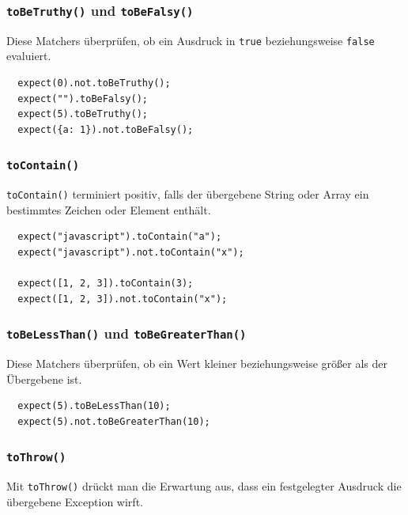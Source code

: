 \documentclass[11pt, a4paper]{article}
\begin{document}
\subsubsection*{\texttt{toBeTruthy()} und \texttt{toBeFalsy()}}

Diese Matchers überprüfen, ob ein Ausdruck in \texttt{true} beziehungsweise
\texttt{false} evaluiert.

\begin{verbatim}
  expect(0).not.toBeTruthy();
  expect("").toBeFalsy();
  expect(5).toBeTruthy();
  expect({a: 1}).not.toBeFalsy();
\end{verbatim}

\clearpage

\subsubsection*{\texttt{toContain()}}

\texttt{toContain()} terminiert positiv, falls der übergebene String oder Array
ein bestimmtes Zeichen oder Element enthält.

\begin{verbatim}
  expect("javascript").toContain("a");
  expect("javascript").not.toContain("x");

  expect([1, 2, 3]).toContain(3);
  expect([1, 2, 3]).not.toContain("x");
\end{verbatim}

\subsubsection*{\texttt{toBeLessThan()} und \texttt{toBeGreaterThan()}}

Diese Matchers überprüfen, ob ein Wert kleiner beziehungsweise größer als der
Übergebene ist.

\begin{verbatim}
  expect(5).toBeLessThan(10);
  expect(5).not.toBeGreaterThan(10);
\end{verbatim}

\subsubsection*{\texttt{toThrow()}}

Mit \texttt{toThrow()} drückt man die Erwartung aus, dass ein festgelegter
Ausdruck die übergebene Exception wirft.
\end{document}
